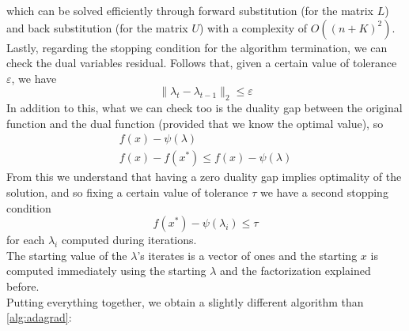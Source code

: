 \documentclass[notitlepage]{article}
\begin{document}
which can be solved efficiently through forward substitution (for the matrix $L$) and back substitution (for the matrix $U$) with a complexity of $O((n+K)^2)$.\\
Lastly, regarding the stopping condition for the algorithm termination, we can check the dual variables residual. Follows that, given a certain value of tolerance $\varepsilon$, we have %
\begin{equation}
    \|\lambda_{t} - \lambda_{t-1}\|_2 \le \varepsilon
  \label{eqn:stopping-condition}
\end{equation}
In addition to this, what we can check too is the duality gap between the original function and the dual function (provided that we know the optimal value), so
\begin{equation}
  \begin{gathered}
    f(x) - \psi(\lambda) \\
    f(x) - f(x^*) \le f(x) - \psi(\lambda)
    \label{eqn:dual-stopcondition}
  \end{gathered}
\end{equation}
From this we understand that having a zero duality gap implies optimality of the solution, and so fixing a certain value of tolerance $\tau$ we have a second stopping condition
\[
  f(x^*) - \psi(\lambda_i) \le \tau  
\] 
for each $\lambda_i$ computed during iterations.\\
The starting value of the $\lambda$'s iterates is a vector of ones and the starting $x$ is computed immediately using the starting $\lambda$ and the factorization explained before.\\
Putting everything together, we obtain a slightly different algorithm than \ref{alg:adagrad}:
\end{document}
